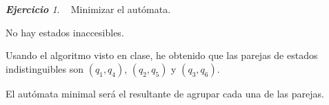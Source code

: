 \documentclass[12pt,spanish]{article}
\theoremstyle{definition}
\theoremstyle{remark}
\newtheorem{exercise}{\textbf{Ejercicio}}%
\begin{document}
\newpage

\begin{exercise}~ Minimizar el autómata. \\
\vspace{-7mm}
  \begin{figure}[H]
    \centering
  \end{figure}
  \vspace{-7mm}
  
  No hay estados inaccesibles.
  
  Usando el algoritmo visto en clase, he obtenido que las parejas de
  estados indistinguibles son $(q_1,q_4)$, $(q_2,q_5)$ y $(q_3,q_6)$.

  El autómata minimal será el resultante de agrupar cada una de las
  parejas.

  \begin{figure}[H]
    \centering
  \end{figure}
  
\end{exercise}
\end{document}
